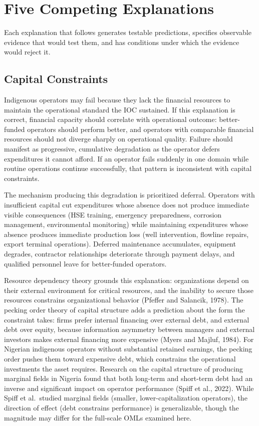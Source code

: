 \hypertarget{five-competing-explanations}{%
\section{Five Competing
Explanations}\label{five-competing-explanations}}

Each explanation that follows generates testable predictions, specifies
observable evidence that would test them, and has conditions under which
the evidence would reject it.

\hypertarget{capital-constraints}{%
\subsection{Capital Constraints}\label{capital-constraints}}

Indigenous operators may fail because they lack the financial resources
to maintain the operational standard the IOC sustained. If this
explanation is correct, financial capacity should correlate with
operational outcome: better-funded operators should perform better, and
operators with comparable financial resources should not diverge sharply
on operational quality. Failure should manifest as progressive,
cumulative degradation as the operator defers expenditures it cannot
afford. If an operator fails suddenly in one domain while routine
operations continue successfully, that pattern is inconsistent with
capital constraints.

The mechanism producing this degradation is prioritized deferral.
Operators with insufficient capital cut expenditures whose absence does
not produce immediate visible consequences (HSE training, emergency
preparedness, corrosion management, environmental monitoring) while
maintaining expenditures whose absence produces immediate production
loss (well intervention, flowline repairs, export terminal operations).
Deferred maintenance accumulates, equipment degrades, contractor
relationships deteriorate through payment delays, and qualified
personnel leave for better-funded operators.

Resource dependency theory grounds this explanation: organizations
depend on their external environment for critical resources, and the
inability to secure those resources constrains organizational behavior
(Pfeffer and Salancik, 1978). The pecking order theory of capital
structure adds a prediction about the form the constraint takes: firms
prefer internal financing over external debt, and external debt over
equity, because information asymmetry between managers and external
investors makes external financing more expensive (Myers and Majluf,
1984). For Nigerian indigenous operators without substantial retained
earnings, the pecking order pushes them toward expensive debt, which
constrains the operational investments the asset requires. Research on
the capital structure of producing marginal fields in Nigeria found that
both long-term and short-term debt had an inverse and significant impact
on operator performance (Spiff et al., 2022). While Spiff et al.~studied
marginal fields (smaller, lower-capitalization operators), the direction
of effect (debt constrains performance) is generalizable, though the
magnitude may differ for the full-scale OMLs examined here.

